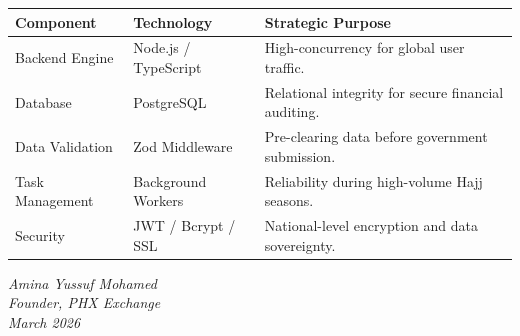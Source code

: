 \documentclass[11pt,a4paper]{article}
\begin{document}
\begin{center}
\begin{tabular}{|>{\raggedright\arraybackslash}p{3.5cm}|>{\raggedright\arraybackslash}p{3.5cm}|>{\raggedright\arraybackslash}p{7cm}|}
\hline
\rowcolor{headergray}
\textbf{Component} & \textbf{Technology} & \textbf{Strategic Purpose} \\
\hline
Backend Engine & Node.js / TypeScript & High-concurrency for global user traffic. \\
\hline
Database & PostgreSQL & Relational integrity for secure financial auditing. \\
\hline
Data Validation & Zod Middleware & Pre-clearing data before government submission. \\
\hline
Task Management & Background Workers & Reliability during high-volume Hajj seasons. \\
\hline
Security & JWT / Bcrypt / SSL & National-level encryption and data sovereignty. \\
\hline
\end{tabular}
\end{center}

\vspace{1.5cm}

\begin{center}
\textit{Amina Yussuf Mohamed}\\
\textit{Founder, PHX Exchange}\\
\textit{March 2026}
\end{center}
\end{document}
